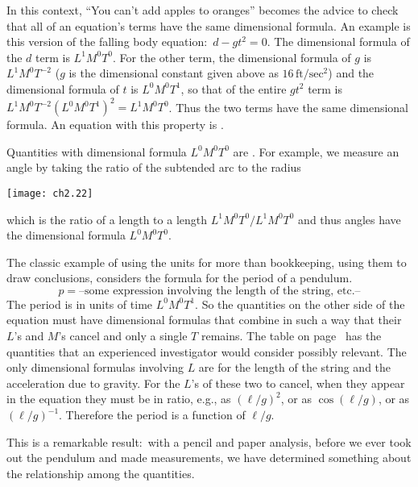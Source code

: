 In this context, ``You can't add apples to oranges'' becomes
the advice to check that all of an equation's terms have 
the same dimensional formula.
An example is this version of the falling body equation:~$d-gt^2=0$. 
The dimensional formula of the $d$ term is $L^1M^0T^0$. 
For the other term, the dimensional formula of $g$ is $L^1M^0T^{-2}$ 
($g$ is the dimensional constant given above as $16\,\text{ft}/\text{sec}^2$) 
and the dimensional formula of $t$ is $L^0M^0T^1$, so that of  
the entire $gt^2$ term is
$L^1M^0T^{-2}(L^0M^0T^1)^2=L^1M^0T^0$. 
Thus the two terms have the same dimensional formula.
An equation with this property is .

Quantities with dimensional formula $L^0M^0T^0$ are .
For example, we measure an angle by taking
the ratio of the subtended arc to the radius
\begin{center}
  \texttt{[image: ch2.22]}
\end{center}
which is the ratio of a length to a length $L^1M^0T^0/L^1M^0T^0$ and
thus angles have the dimensional formula $L^0M^0T^0$.

The classic example of using the units for more than bookkeeping, using them 
to draw conclusions, considers the formula for the period of a pendulum.
\begin{equation*}
  p=\text{--some expression involving the length of the string, etc.--}
\end{equation*}
The period is in units of time $L^0M^0T^1$.
So the quantities on the 
other side of the equation must have dimensional formulas that combine 
in such a way that their $L$'s and $M$'s cancel and only a 
single $T$ remains.
The table on page~\pageref{table:Dimen} has the quantities that
an experienced investigator would consider possibly relevant. 
The only dimensional formulas involving $L$ are for
the length of the string and the acceleration due to gravity.
For the $L$'s of these two to cancel, when they appear 
in the equation they must be in ratio,
e.g., as $(\ell/g)^2$, or as $\cos(\ell/g)$, 
or as $(\ell/g)^{-1}$.
Therefore the period is a function of $\ell/g$. 

This is a remarkable result:~with a pencil and paper analysis,
before we ever took out the pendulum and made measurements,
we have determined something about the relationship
among the quantities. 

